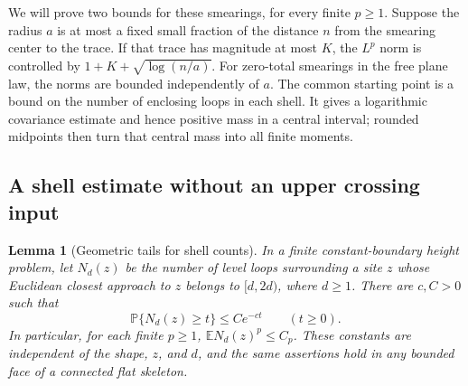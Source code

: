 \documentclass[11pt]{article}
\newtheorem{lemma}[theorem]{Lemma}
\theoremstyle{definition}
\theoremstyle{remark}
\numberwithin{equation}{section}
\begin{document}
We will prove two bounds for these smearings, for every finite $p\geq1$.
Suppose the radius $a$ is at most a fixed small fraction of the distance
$n$ from the smearing center to the trace.  If that trace has magnitude
at most $K$, the $L^p$ norm is controlled by
$1+K+\sqrt{\log(n/a)}$.  For zero-total smearings in the free plane
law, the norms are bounded independently of $a$.  The common starting point is a bound on the
number of enclosing loops in each shell.  It gives a logarithmic
covariance estimate and hence positive mass in a central interval;
rounded midpoints then turn that central mass into all finite moments.

\subsection{A shell estimate without an upper crossing input}

\begin{lemma}[Geometric tails for shell counts]\label{lem:shell-moments}
In a finite constant-boundary height problem, let $N_d(z)$ be the number
of level loops surrounding a site $z$ whose Euclidean closest approach
to $z$ belongs to $[d,2d)$, where $d\geq1$.  There are $c,C>0$ such that
\begin{equation}\label{moments:shell-tail}
 \mathbb P\{N_d(z)\geq t\}\leq Ce^{-ct}\qquad(t\geq0).
\end{equation}
In particular, for each finite $p\geq1$, $\mathbb E N_d(z)^p\leq C_p$.
These constants are independent of the shape, $z$, and $d$, and the
same assertions hold in any bounded face of a connected flat skeleton.
\end{lemma}
\end{document}
